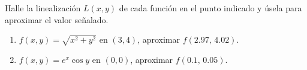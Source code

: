 Halle la linealización $L(x,y)$ de cada función en el punto indicado y úsela para aproximar el valor señalado.
\begin{enumerate}
    \item $f(x,y) = \sqrt{x^2 + y^2}$ en $(3, 4)$, aproximar $f(2.97,\, 4.02)$.
    \item $f(x,y) = e^x \cos y$ en $(0, 0)$, aproximar $f(0.1,\, 0.05)$.
\end{enumerate}
